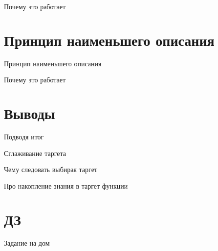 \documentclass[14pt, fleqn, xcolor={dvipsnames, table}]{beamer}
\begin{document}
\begin{frame}{Почему это работает} %
\end{frame}

\section{Принцип наименьшего описания}

\begin{frame}{Принцип наименьшего описания}
\end{frame}

\begin{frame}{Почему это работает} %
\end{frame}

\section{Выводы}
\begin{frame}{Подводя итог}
\end{frame}

\begin{frame}{Сглаживание таргета}
\end{frame}

\begin{frame}{Чему следовать выбирая таргет}
\end{frame}

\begin{frame}{Про накопление знания в таргет функции}
\end{frame}

\section{ДЗ}
\begin{frame}{Задание на дом}
\end{frame}
\end{document}
